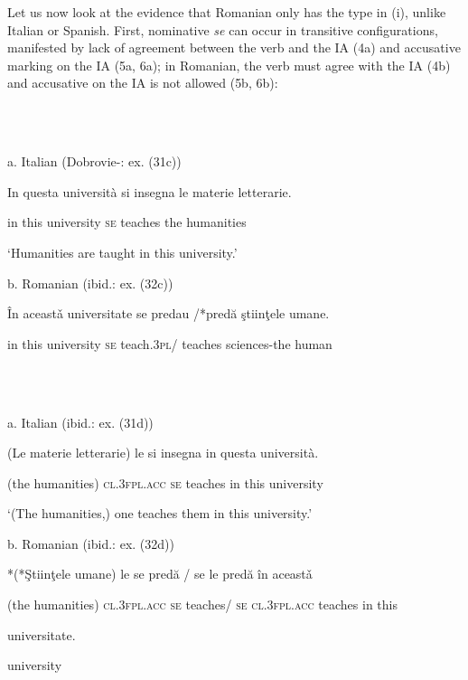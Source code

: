 \documentclass[output=paper]{langsci/langscibook}
\begin{document}
Let us now look at the evidence that Romanian only has the type in (i), unlike Italian or Spanish. First, nominative \textit{se} can occur in transitive configurations, manifested by lack of agreement between the verb and the IA (4a) and accusative marking on the IA (5a, 6a); in Romanian, the verb must agree with the IA (4b) and accusative on the IA is not allowed (5b, 6b):

\ea%
    \label{ex:key:4}
    \gll\\
        \\
    \glt
    \z

          a.   Italian (Dobrovie-\citealt{Sorin2017}: ex. (31c))

In questa università  si    insegna  le   materie letterarie.

       in this      university \textsc{se}   teaches   the humanities              

            ‘Humanities are taught in this university.’

  b.    Romanian (ibid.: ex. (32c))

În aceastǎ universitate se   predau   /*predă     ştiinţele        umane.

in this      university     \textsc{se}  teach.3\textsc{pl}/ teaches  sciences-the human   

\ea%
    \label{ex:key:5}
    \gll\\
        \\
    \glt
    \z

          a.   Italian (ibid.: ex. (31d))

(Le materie letterarie) le                    si   insegna  in questa università. 

        (the humanities)          \textsc{cl.3fpl.acc}  \textsc{se}  teaches  in this     university

        ‘(The humanities,) one teaches them in this university.’  

  b.   Romanian (ibid.: ex. (32d))

*(*Ştiinţele umane) le                 se  predă   / se le                   predă    în aceastǎ 

                 (the humanities)   \textsc{cl.3fpl.acc se} teaches/ \textsc{se} \textsc{cl.3fpl.acc}  teaches in this       

      universitate.

\begin{styleDSb}
        university        
\end{styleDSb}
\end{document}
